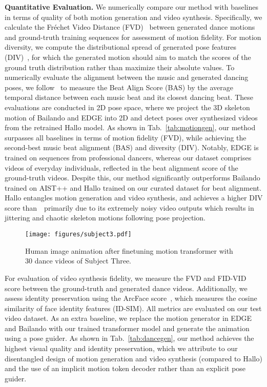 \noindent \textbf{Quantitative Evaluation.} We numerically compare our method with baselines in terms of quality of both motion generation and video synthesis. Specifically, we calculate the Fréchet Video Distance (FVD)~\cite{unterthiner2018towards,ge2024content} between generated dance motions and ground-truth training sequences for assessment of motion fidelity. 
For motion diversity, we compute the distributional spread of generated pose features (DIV)~\cite{aist++,bailando}, for which the generated motion should aim to match the scores of the ground truth distribution rather than maximize their absolute values.  To numerically evaluate the alignment between the music and generated dancing poses, we follow~\cite{aist++,bailando} to measure the Beat Align Score (BAS) by the average temporal distance between each music beat and its closest dancing beat. These evaluations are conducted in 2D pose space, where we project the 3D skeleton motion of Bailando and EDGE into 2D and detect poses over synthesized videos from the retrained Hallo model. As shown in Tab.~\ref{tab:motiongen}, our method surpasses all baselines in terms of motion fidelity (FVD), while achieving the second-best music beat alignment (BAS) and diversity (DIV). Notably, EDGE is trained on sequences from professional dancers, whereas our dataset comprises videos of everyday individuals, reflected in the beat alignment score of the ground-truth videos. Despite this, our method significantly outperforms Bailando trained on AIST++ and Hallo trained on our curated dataset for beat alignment. Hallo entangles motion generation and video synthesis, and achieves a higher DIV score than~\papername~primarily due to its extremely noisy video outputs which results in jittering and chaotic skeleton motions following pose projection. 

\begin{figure}[t]
\centering
\texttt{[image: figures/subject3.pdf]}
\vspace{-2mm}
\caption{Human image animation after finetuning motion transformer with 30 dance videos of Subject Three. }
\vspace{-5mm}
\label{fig:characterized}
\end{figure}

For evaluation of video synthesis fidelity, we measure the FVD and FID-VID~\cite{balaji2019conditional} score between the ground-truth and generated dance videos. Additionally, we assess identity preservation using the ArcFace score~\cite{deng2019arcface}, which measures the cosine similarity of face identity features (ID-SIM). All metrics are evaluated on our test video dataset. As an extra baseline, we replace the motion generator in EDGE and Bailando with our trained transformer model and generate the animation using a pose guider. As shown in Tab.~\ref{tab:dancegen}, our method achieves the highest visual quality and identity preservation, which we attribute to our disentangled design of motion generation and video synthesis (compared to Hallo) and the use of an implicit motion token decoder rather than an explicit pose guider.

